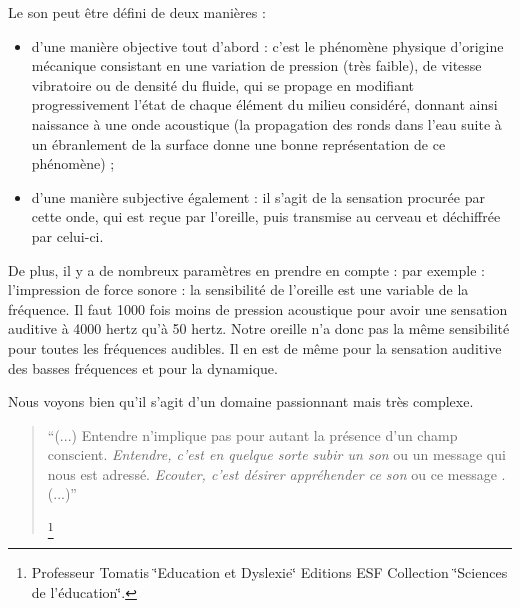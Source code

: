 Le son peut être défini de deux manières : 
\begin{itemize}
\item d'une manière objective tout d'abord : c'est le phénomène physique
d'origine mécanique consistant en une variation de pression (très
faible), de vitesse vibratoire ou de densité du fluide, qui se propage
en modifiant progressivement l'état de chaque élément du milieu considéré,
donnant ainsi naissance à une onde acoustique (la propagation des
ronds dans l'eau suite à un ébranlement de la surface donne une bonne
représentation de ce phénomène) ; 
\item d'une manière subjective également : il s'agit de la sensation procurée
par cette onde, qui est reçue par l'oreille, puis transmise au cerveau
et déchiffrée par celui-ci.
\end{itemize}
De plus, il y a de nombreux paramètres en prendre en compte : par
exemple : l'impression de force sonore : la sensibilité de l'oreille
est une variable de la fréquence. Il faut 1000 fois moins de pression
acoustique pour avoir une sensation auditive à 4000 hertz qu'à 50
hertz. Notre oreille n'a donc pas la même sensibilité pour toutes
les fréquences audibles. Il en est de même pour la sensation auditive
des basses fréquences et pour la dynamique. 

Nous voyons bien qu'il s'agit d'un domaine passionnant mais très complexe.
\begin{quote}
``(...) Entendre n'implique pas pour autant la présence d'un champ
conscient.\emph{ Entendre, c\textquoteright est en quelque sorte subir
un son }ou un message qui nous est adressé. \emph{Ecouter, c'est désirer
appréhender ce son }ou ce message . (...)'' 

\footnote{Professeur Tomatis \char`\"{}Education et Dyslexie\char`\"{} Editions
ESF Collection \char`\"{}Sciences de l'éducation\char`\"{}.}
\end{quote}
